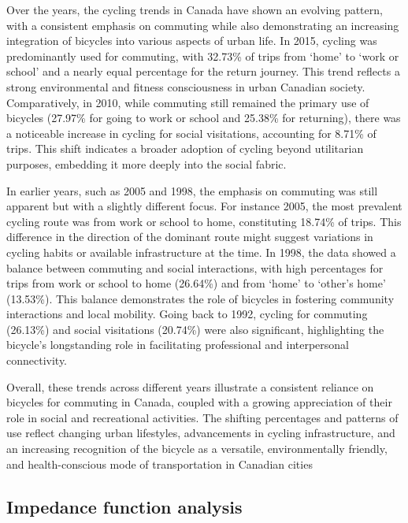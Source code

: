 \documentclass[
11pt, %
oneside, %
english, %
singlespacing, %
]{macthesis} %
\begin{document}
Over the years, the cycling trends in Canada have shown an evolving pattern, with a consistent emphasis on commuting while also demonstrating an increasing integration of bicycles into various aspects of urban life. In 2015, cycling was predominantly used for commuting, with 32.73\% of trips from `home' to `work or school' and a nearly equal percentage for the return journey. This trend reflects a strong environmental and fitness consciousness in urban Canadian society. Comparatively, in 2010, while commuting still remained the primary use of bicycles (27.97\% for going to work or school and 25.38\% for returning), there was a noticeable increase in cycling for social visitations, accounting for 8.71\% of trips. This shift indicates a broader adoption of cycling beyond utilitarian purposes, embedding it more deeply into the social fabric.

In earlier years, such as 2005 and 1998, the emphasis on commuting was still apparent but with a slightly different focus. For instance 2005, the most prevalent cycling route was from work or school to home, constituting 18.74\% of trips. This difference in the direction of the dominant route might suggest variations in cycling habits or available infrastructure at the time. In 1998, the data showed a balance between commuting and social interactions, with high percentages for trips from work or school to home (26.64\%) and from `home' to `other's home' (13.53\%). This balance demonstrates the role of bicycles in fostering community interactions and local mobility. Going back to 1992, cycling for commuting (26.13\%) and social visitations (20.74\%) were also significant, highlighting the bicycle's longstanding role in facilitating professional and interpersonal connectivity.

Overall, these trends across different years illustrate a consistent reliance on bicycles for commuting in Canada, coupled with a growing appreciation of their role in social and recreational activities. The shifting percentages and patterns of use reflect changing urban lifestyles, advancements in cycling infrastructure, and an increasing recognition of the bicycle as a versatile, environmentally friendly, and health-conscious mode of transportation in Canadian cities

\hypertarget{impedance-function-analysis}{%
\subsection{Impedance function analysis}\label{impedance-function-analysis}}
\end{document}
